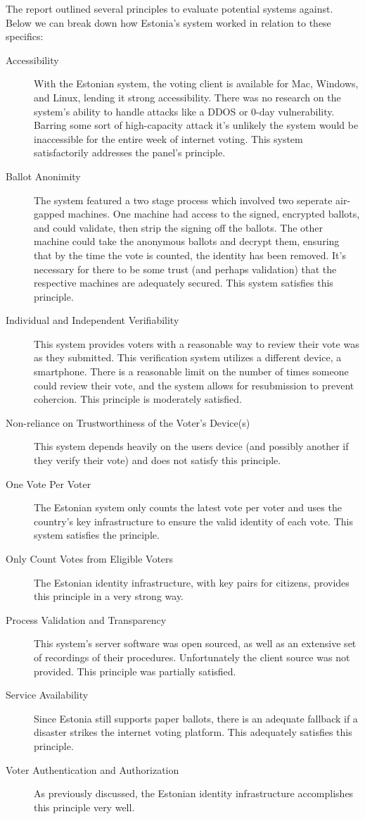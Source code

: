 \documentclass[a4paper, 11pt]{article} %
\begin{document}
The report \cite{internet-voting-report} outlined several principles to evaluate potential systems against. Below we can break down how Estonia's system worked in relation to these specifics:

\begin{description}
    \item[Accessibility] With the Estonian system, the voting client is available for Mac, Windows, and Linux, lending it strong accessibility. There was no research on the system's ability to handle attacks like a DDOS or 0-day vulnerability. Barring some sort of high-capacity attack it's unlikely the system would be inaccessible for the entire week of internet voting. This system satisfactorily addresses the panel's principle.
    \item[Ballot Anonimity] The system featured a two stage process which involved two seperate air-gapped machines. One machine had access to the signed, encrypted ballots, and could validate, then strip the signing off the ballots. The other machine could take the anonymous ballots and decrypt them, ensuring that by the time the vote is counted, the identity has been removed. It's necessary for there to be some trust (and perhaps validation) that the respective machines are adequately secured. This system satisfies this principle.
    \item[Individual and Independent Verifiability] This system provides voters with a reasonable way to review their vote was as they submitted. This verification system utilizes a different device, a smartphone. There is a reasonable limit on the number of times someone could review their vote, and the system allows for resubmission to prevent cohercion. This principle is moderately satisfied.
    \item[Non-reliance on Trustworthiness of the Voter’s Device(s)] This system depends heavily on the users device (and possibly another if they verify their vote) and does not satisfy this principle.
    \item[One Vote Per Voter] The Estonian system only counts the latest vote per voter and uses the country's key infrastructure to ensure the valid identity of each vote. This system satisfies the principle.
    \item[Only Count Votes from Eligible Voters] The Estonian identity infrastructure, with key pairs for citizens, provides this principle in a very strong way.
    \item[Process Validation and Transparency] This system's server software was open sourced, as well as an extensive set of recordings of their procedures. Unfortunately the client source was not provided. This principle was partially satisfied.
    \item[Service Availability] Since Estonia still supports paper ballots, there is an adequate fallback if a disaster strikes the internet voting platform. This adequately satisfies this principle.
    \item[Voter Authentication and Authorization] As previously discussed, the Estonian identity infrastructure accomplishes this principle very well.
\end{description}
\end{document}
